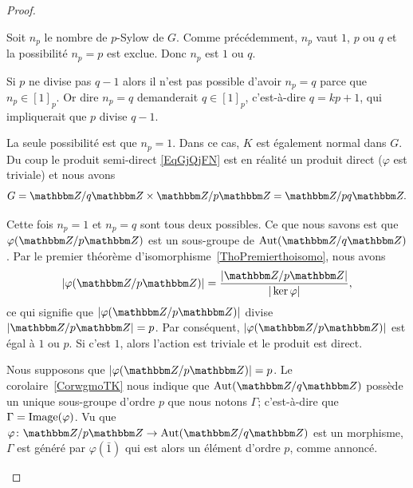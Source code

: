 \begin{proof}
\begin{subproof}
        Soit \( n_p\) le nombre de \( p\)-Sylow de \( G\). Comme précédemment, \( n_p\) vaut \( 1\), \( p\) ou \( q\) et la possibilité \( n_p=p\) est exclue. Donc \( n_p\) est \( 1\) ou \( q\).

    \item[Si \( p\) ne divise pas \( q-1\)]

        Si \( p\) ne divise pas \( q-1\) alors il n'est pas possible d'avoir \( n_p=q\) parce que \( n_p\in [1]_p\). Or dire \( n_p=q\) demanderait \( q\in [1]_p\), c'est-à-dire \( q=kp+1\), qui impliquerait que \( p\) divise \( q-1\).

        La seule possibilité est que \( n_p=1\). Dans ce cas, \( K\) est également normal dans \( G\). Du coup le produit semi-direct \eqref{EqGjQjFN} est en réalité un produit direct (\( \varphi\) est triviale) et nous avons
        \begin{equation}
            G=\eZ/q\eZ\times \eZ/p\eZ=\eZ/pq\eZ.
        \end{equation}

    \item[Si \( p\) divise \( q-1\)]

        Cette fois \( n_p=1\) et \( n_p=q\) sont tous deux possibles. Ce que nous savons est que \( \varphi(\eZ/p\eZ)\) est un sous-groupe de \( \Aut(\eZ/q\eZ)\). Par le premier théorème d'isomorphisme~\ref{ThoPremierthoisomo}, nous avons
        \begin{equation}
            | \varphi(\eZ/p\eZ) |=\frac{ | \eZ/p\eZ | }{ | \ker\varphi | },
        \end{equation}
        ce qui signifie que \( | \varphi(\eZ/p\eZ) |\) divise \( | \eZ/p\eZ |=p\). Par conséquent, \( | \varphi(\eZ/p\eZ) |\) est égal à \( 1\) ou \( p\). Si c'est \( 1\), alors l'action est triviale et le produit est direct.

        Nous supposons que \( | \varphi(\eZ/p\eZ) |=p\). Le corolaire~\ref{CorwgmoTK} nous indique que \( \Aut(\eZ/q\eZ)\) possède un unique sous-groupe d'ordre \( p\) que nous notons \( \Gamma\); c'est-à-dire que \( \Gamma=\operatorname{Image}(\varphi)\). Vu que \( \varphi\colon \eZ/p\eZ\to \Aut(\eZ/q\eZ)\) est un morphisme, \( \Gamma\) est généré par \( \varphi(\bar 1)\) qui est alors un élément d'ordre \( p\), comme annoncé.


\end{subproof}
\end{proof}

